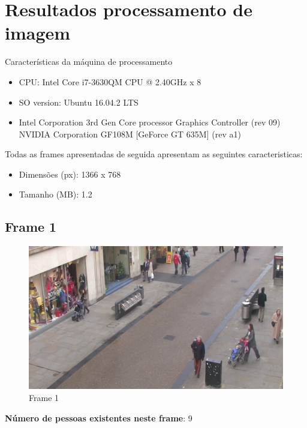 \chapter{Resultados processamento de imagem }

Características da máquina de processamento  
\begin{itemize}
	\item CPU: Intel Core i7-3630QM CPU @ 2.40GHz x 8
	\item SO version: Ubuntu 16.04.2 LTS
	\item Intel Corporation 3rd Gen Core processor Graphics Controller (rev 09)
	NVIDIA Corporation GF108M [GeForce GT 635M] (rev a1)
\end{itemize}

Todas as frames apresentadas de seguida apresentam as seguintes caracteristicas: 
\begin{itemize}
	\item Dimensões (px): 1366 x 768
	\item Tamanho (MB): 1.2 
\end{itemize}


\section{Frame 1}



\begin{figure}[!htb]
	\centering
	\includegraphics[width=0.5\linewidth]{img/vision/frame1.png}
	\caption{Frame 1 }
	\label{db}
\end{figure}


\textbf{Número de pessoas existentes neste frame}: 9



